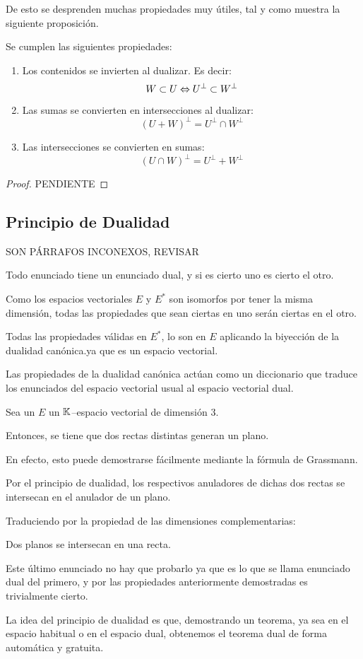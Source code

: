 De esto se desprenden muchas propiedades muy útiles, tal y como muestra la siguiente proposición.
\begin{prop}
	Se cumplen las siguientes propiedades:
	\begin{enumerate}
		\item Los contenidos se invierten al dualizar. Es decir: \[W\subset U\Leftrightarrow U^{\perp}\subset W^{\perp}\]
		\item Las sumas se convierten en intersecciones al dualizar:
		\[(U+W)^{\perp}=U^{\perp}\cap W^{\perp}\]
		\item Las intersecciones se convierten en sumas:
		\[(U\cap W)^{\perp}=U^{\perp}+ W^{\perp}\]
	\end{enumerate}
\end{prop}
\begin{proof}
	PENDIENTE
\end{proof}
\subsection{Principio de Dualidad}
SON PÁRRAFOS INCONEXOS, REVISAR

Todo enunciado tiene un enunciado dual, y si es cierto uno es cierto el otro.

Como los espacios vectoriales $E$ y $E^*$ son isomorfos por tener la misma dimensión, todas las propiedades que sean ciertas en uno serán ciertas en el otro.

Todas las propiedades válidas en $E^*$, lo son en $E$ aplicando la biyección de la dualidad canónica.ya que es un espacio vectorial.

Las propiedades de la dualidad canónica actúan como un diccionario que traduce los enunciados del espacio vectorial usual al espacio vectorial dual.

\begin{exa}
	Sea un $E$ un $\mathbb{K}$--espacio vectorial de dimensión $3$.
	
	Entonces, se tiene que dos rectas distintas generan un plano.
	
	En efecto, esto puede demostrarse fácilmente mediante la fórmula de Grassmann.
	
	Por el principio de dualidad, los respectivos anuladores de dichas dos rectas se intersecan en el anulador de un plano.
	
	Traduciendo por la propiedad de las dimensiones complementarias:
	
	Dos planos se intersecan en una recta.
	
	Este último enunciado no hay que probarlo ya que es lo que se llama enunciado dual del primero, y por las propiedades anteriormente demostradas es trivialmente cierto.
\end{exa}

La idea del principio de dualidad es que, demostrando un teorema, ya sea en el espacio habitual o en el espacio dual, obtenemos el teorema dual de forma automática y gratuita.
